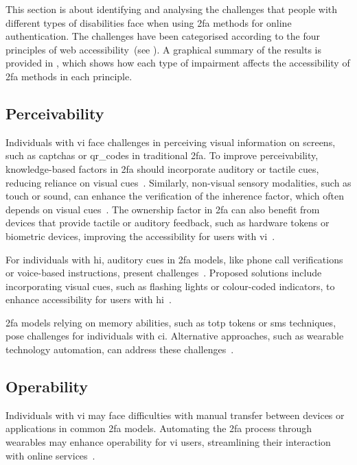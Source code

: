 This section is about identifying and analysing the challenges that people with different types of disabilities face when using \ac{2fa} methods for online authentication. The challenges have been categorised according to the four principles of web accessibility~(see ). A graphical summary of the results is provided in , which shows how each type of impairment affects the accessibility of \ac{2fa} methods in each principle.

\subsection{Perceivability}
\label{sec:challenges:perceivability}

Individuals with \ac{vi} face challenges in perceiving visual information on screens, such as \acp{captcha} or \acp{qr_code} in traditional \ac{2fa}. To improve perceivability, knowledge-based factors in \ac{2fa} should incorporate auditory or tactile cues, reducing reliance on visual cues~\cite{chen_2015,konoth_2020}. Similarly, non-visual sensory modalities, such as touch or sound, can enhance the verification of the inherence factor, which often depends on visual cues~\cite{konoth_2020,chen_2015}. The ownership factor in \ac{2fa} can also benefit from devices that provide tactile or auditory feedback, such as hardware tokens or biometric devices, improving the accessibility for users with \ac{vi}~\cite{chen_2015}.

For individuals with \ac{hi}, auditory cues in \ac{2fa} models, like phone call verifications or voice-based instructions, present challenges~\cite{zhu_2022}. Proposed solutions include incorporating visual cues, such as flashing lights or colour-coded indicators, to enhance accessibility for users with \ac{hi}~\cite{ward_2019}.

\Ac{2fa} models relying on memory abilities, such as \acf{totp} tokens or \acf{sms} techniques, pose challenges for individuals with \ac{ci}. Alternative approaches, such as wearable technology automation, can address these challenges~\cite{chen_2015}.

\subsection{Operability}
\label{sec:challenges:operability}

Individuals with \ac{vi} may face difficulties with manual transfer between devices or applications in common \ac{2fa} models. Automating the \ac{2fa} process through wearables may enhance operability for \ac{vi} users, streamlining their interaction with online services~\cite{chen_2015}.

